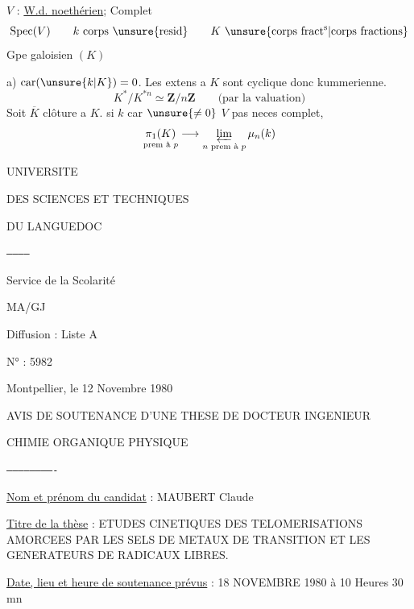 $V$ : \uline{W.d. noethérien}; Complet
\[
\operatorname{Spec}(V)\qquad k\ \text{corps \unsure{resid}}\qquad K\ \text{\unsure{corps fract\textsuperscript{s}|corps fractions}}
\]
Gpe galoisien $(K)$

a) $\operatorname{car}(\unsure{k|K})=0$\qquad {}.
Les extens a $K$ sont  cyclique donc kummerienne.
\[
K^*/K^{*n}\simeq\mathbf Z/n\mathbf Z\qquad\text{(par la valuation)}
\]
Soit $\overline K$ clôture a $K$.
si $k$ car $\unsure{\ne0}$ $V$ pas neces complet,
\[
\underset{\text{prem à }p}{\pi_1(K)}\longrightarrow\varprojlim_{n\text{ prem à }p}\mu_n(k)
\]

UNIVERSITE

DES SCIENCES ET TECHNIQUES

DU LANGUEDOC

\texttt{------------}

Service de la Scolarité

MA/GJ

Diffusion : Liste A

N° : 5982

Montpellier, le 12 Novembre 1980

AVIS DE SOUTENANCE D'UNE THESE DE DOCTEUR INGENIEUR

CHIMIE ORGANIQUE PHYSIQUE

\texttt{-------------------------}

\uline{Nom et prénom du candidat} : MAUBERT Claude

\uline{Titre de la thèse} : ETUDES CINETIQUES DES TELOMERISATIONS AMORCEES PAR LES SELS DE METAUX DE TRANSITION ET LES GENERATEURS DE RADICAUX LIBRES.

\uline{Date, lieu et heure de soutenance prévus} : 18 NOVEMBRE 1980 à 10 Heures 30 mn

